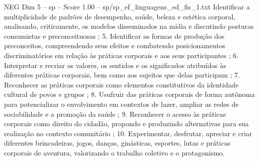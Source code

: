 \begin{textsample}{NEG Dim 5 – sp – Score 1.00 – sp/sp\_ef\_linguagens\_ed\_fis\_1.txt}
Identificar a multiplicidade de padrões de desempenho, saúde, beleza e estética corporal, analisando, criticamente, os modelos disseminados na mídia e discutindo posturas consumistas e preconceituosas ; 5.
Identificar as formas de produção dos preconceitos, compreendendo seus efeitos e combatendo posicionamentos discriminatórios em relação às práticas corporais e aos seus participantes ; 6.
Interpretar e recriar os valores, os sentidos e os significados atribuídos às diferentes práticas corporais, bem como aos sujeitos que delas participam ; 7.
Reconhecer as práticas corporais como elementos constitutivos da identidade cultural de povos e grupos ; 8.
Usufruir das práticas corporais de forma autônoma para potencializar o envolvimento em contextos de lazer, ampliar as redes de sociabilidade e a promoção da saúde ; 9.
Reconhecer o acesso às práticas corporais como direito do cidadão, propondo e produzindo alternativas para sua realização no contexto comunitário ; 10.
Experimentar, desfrutar, apreciar e criar diferentes brincadeiras, jogos, danças, ginásticas, esportes, lutas e práticas corporais de aventura, valorizando o trabalho coletivo e o protagonismo.

\end{textsample}
